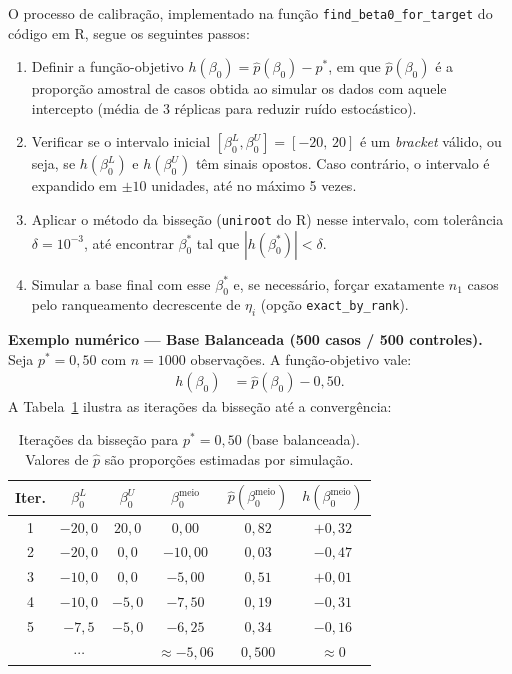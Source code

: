 \documentclass[
    12pt,
    a4paper,
    oneside,
    english,
    french,
    spanish,
    brazil
    ]{abntex2}
\renewcommand{\arraystretch}{1.3}
\newcommand{\novo}[1]{\textcolor{corNova}{#1}}
\begin{document}
\novo{O processo de calibração, implementado na função \texttt{find\_beta0\_for\_target} do código em R, segue os seguintes passos:
\begin{enumerate}
  \item Definir a função-objetivo $h(\beta_0) = \widehat{p}(\beta_0) - p^*$, em que $\widehat{p}(\beta_0)$ é a proporção amostral de casos obtida ao simular os dados com aquele intercepto (média de 3 réplicas para reduzir ruído estocástico).
  \item Verificar se o intervalo inicial $[\beta_0^L, \beta_0^U] = [-20,\, 20]$ é um \textit{bracket} válido, ou seja, se $h(\beta_0^L)$ e $h(\beta_0^U)$ têm sinais opostos. Caso contrário, o intervalo é expandido em $\pm 10$ unidades, até no máximo 5 vezes.
  \item Aplicar o método da bisseção (\texttt{uniroot} do R) nesse intervalo, com tolerância $\delta = 10^{-3}$, até encontrar $\beta_0^*$ tal que $|h(\beta_0^*)| < \delta$.
  \item Simular a base final com esse $\beta_0^*$ e, se necessário, forçar exatamente $n_1$ casos pelo ranqueamento decrescente de $\eta_i$ (opção \texttt{exact\_by\_rank}).
\end{enumerate}}

\novo{\textbf{Exemplo numérico --- Base Balanceada (500 casos / 500 controles).} Seja $p^* = 0{,}50$ com $n = 1000$ observações. A função-objetivo vale:
\begin{align*}
h(\beta_0) &= \widehat{p}(\beta_0) - 0{,}50.
\end{align*}
A Tabela~\ref{tab:bissecao_bal} ilustra as iterações da bisseção até a convergência:}

\begin{table}[H]
\centering
\caption{\novo{Iterações da bisseção para $p^* = 0{,}50$ (base balanceada). Valores de $\widehat{p}$ são proporções estimadas por simulação.}}
\label{tab:bissecao_bal}
\small
\renewcommand{\arraystretch}{1.3}
\begin{tabular}{cccccc}
\hline
\textbf{Iter.} & $\beta_0^L$ & $\beta_0^U$ & $\beta_0^{\text{meio}}$ & $\widehat{p}(\beta_0^{\text{meio}})$ & $h(\beta_0^{\text{meio}})$ \\
\hline
1 & $-20{,}0$ & $20{,}0$ & $ 0{,}00$ & $0{,}82$ & $+0{,}32$ \\
2 & $-20{,}0$ & $ 0{,}0$ & $-10{,}00$ & $0{,}03$ & $-0{,}47$ \\
3 & $-10{,}0$ & $ 0{,}0$ & $ -5{,}00$ & $0{,}51$ & $+0{,}01$ \\
4 & $-10{,}0$ & $-5{,}0$ & $ -7{,}50$ & $0{,}19$ & $-0{,}31$ \\
5 & $ -7{,}5$ & $-5{,}0$ & $ -6{,}25$ & $0{,}34$ & $-0{,}16$ \\
\multicolumn{3}{c}{$\cdots$} & $\approx -5{,}06$ & $0{,}500$ & $\approx 0$ \\
\hline
\end{tabular}
\end{table}
\end{document}
